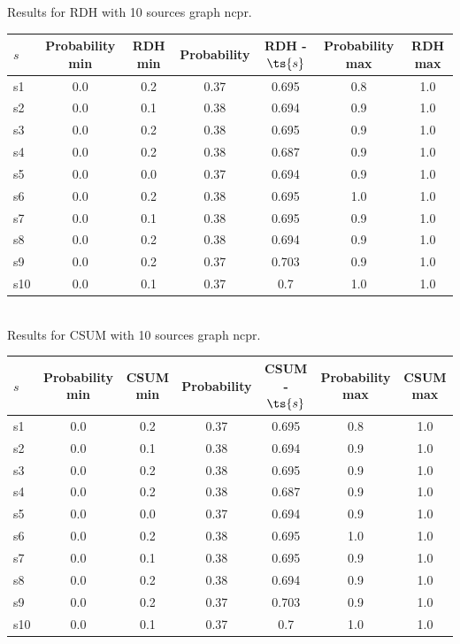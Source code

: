 \documentclass{article}
\begin{document}
\noindent Results for RDH with 10 sources graph ncpr.

\noindent\begin{tabular}{|l|c|c|c|c|c|c|}
\hline
$s$& Probability min & RDH min & Probability & RDH - $\ts{s}$ & Probability max & RDH max\\
\hline
s1 &0.0 & 0.2 & 0.37 & 0.695 & 0.8 & 1.0\\
\hline
s2 &0.0 & 0.1 & 0.38 & 0.694 & 0.9 & 1.0\\
\hline
s3 &0.0 & 0.2 & 0.38 & 0.695 & 0.9 & 1.0\\
\hline
s4 &0.0 & 0.2 & 0.38 & 0.687 & 0.9 & 1.0\\
\hline
s5 &0.0 & 0.0 & 0.37 & 0.694 & 0.9 & 1.0\\
\hline
s6 &0.0 & 0.2 & 0.38 & 0.695 & 1.0 & 1.0\\
\hline
s7 &0.0 & 0.1 & 0.38 & 0.695 & 0.9 & 1.0\\
\hline
s8 &0.0 & 0.2 & 0.38 & 0.694 & 0.9 & 1.0\\
\hline
s9 &0.0 & 0.2 & 0.37 & 0.703 & 0.9 & 1.0\\
\hline
s10 &0.0 & 0.1 & 0.37 & 0.7 & 1.0 & 1.0\\
\hline
\end{tabular}\\

\noindent Results for CSUM with 10 sources graph ncpr.

\noindent\begin{tabular}{|l|c|c|c|c|c|c|}
\hline
$s$& Probability min & CSUM min & Probability & CSUM - $\ts{s}$ & Probability max & CSUM max\\
\hline
s1 &0.0 & 0.2 & 0.37 & 0.695 & 0.8 & 1.0\\
\hline
s2 &0.0 & 0.1 & 0.38 & 0.694 & 0.9 & 1.0\\
\hline
s3 &0.0 & 0.2 & 0.38 & 0.695 & 0.9 & 1.0\\
\hline
s4 &0.0 & 0.2 & 0.38 & 0.687 & 0.9 & 1.0\\
\hline
s5 &0.0 & 0.0 & 0.37 & 0.694 & 0.9 & 1.0\\
\hline
s6 &0.0 & 0.2 & 0.38 & 0.695 & 1.0 & 1.0\\
\hline
s7 &0.0 & 0.1 & 0.38 & 0.695 & 0.9 & 1.0\\
\hline
s8 &0.0 & 0.2 & 0.38 & 0.694 & 0.9 & 1.0\\
\hline
s9 &0.0 & 0.2 & 0.37 & 0.703 & 0.9 & 1.0\\
\hline
s10 &0.0 & 0.1 & 0.37 & 0.7 & 1.0 & 1.0\\
\hline
\end{tabular}\\
\end{document}
